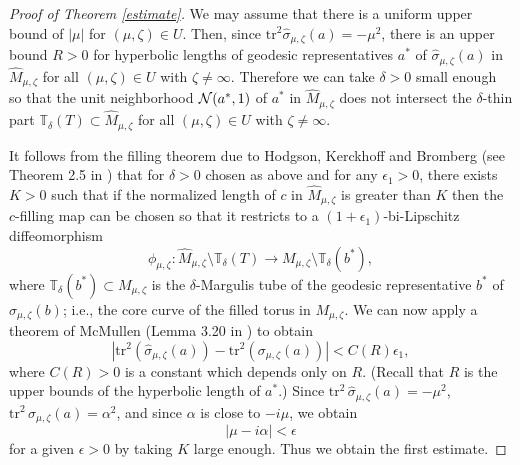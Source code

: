 \documentclass[12pt]{article}
\theoremstyle{plain}
\theoremstyle{definition}
\theoremstyle{remark}
\newcommand{\alp}{\alpha}
\newcommand{\fty}{\infty}
\newcommand{\ep}{\epsilon}
\newcommand{\sm}{\setminus}
\newcommand{\ze}{\zeta}
\newcommand{\tr}{{\mathrm{tr}}}
\begin{document}
\begin{proof} [Proof of Theorem \ref{estimate}]
We may assume that there is a uniform upper bound of $|\mu|$  for  $(\mu,\ze) \in U$. 
Then, since $\tr^2 \hat \sigma_{\mu,\ze}(a)=-\mu^2$, there is an upper bound 
$R>0$ for hyperbolic lengths of 
geodesic representatives $a^*$ of $\hat \sigma_{\mu,\ze}(a)$ in 
$\hat M_{\mu,\ze}$ for all $(\mu,\ze) \in U$ with $\ze \ne \fty$. 
Therefore we can take $\delta>0$ small enough 
so that  the unit neighborhood ${\cal N}(a^*,1)$ of 
$a^*$ in $\hat M_{\mu,\ze}$ does not intersect the 
$\delta$-thin part $\mathbb{T}_\delta(T) \subset \hat M_{\mu,\ze}$ 
for all $(\mu,\ze) \in U$ with $\ze \ne \fty$. 

It follows from the filling theorem due to Hodgson, Kerckhoff and Bromberg (see Theorem 2.5 in \cite{Br}) that 
for $\delta>0$ chosen as above and for any $\ep_1>0$, there exists $K>0$ such that 
if the normalized length  of $c$  in $\hat M_{\mu,\ze}$ is greater than $K$ 
then the $c$-filling map can be chosen  
so that it restricts to a $(1+\ep_1)$-bi-Lipschitz diffeomorphism 
$$
\phi_{\mu,\ze}: \hat M_{\mu,\ze} \sm \mathbb{T}_\delta(T) 
\to M_{\mu,\ze} \sm \mathbb{T}_\delta(b^*),  
$$
where $\mathbb{T}_\delta(b^*) \subset M_{\mu,\ze}$ is the $\delta$-Margulis tube 
of the geodesic representative $b^*$ of $\sigma_{\mu,\ze}(b)$; i.e., 
the core curve of the filled torus in $M_{\mu,\ze}$. 
We can now apply a theorem of McMullen (Lemma 3.20 in \cite{Mc1}) to obtain 
$$
|\tr^2 (\hat \sigma_{\mu,\ze}(a))-\tr^2 ( \sigma_{\mu,\ze}(a))|<C(R)\ep_1, 
$$
where $C(R)>0$ is a constant which depends only on $R$. 
(Recall that $R$ is the upper bounds of the hyperbolic length of $a^*$.)   
Since $\tr^2\, \hat \sigma_{\mu,\ze}(a)=-\mu^2$, $\tr^2\, \sigma_{\mu,\ze}(a)=\alpha^2$,  
and since $\alp$ is close to $-i\mu$,   
we obtain 
$$
|\mu-i\alp|<\ep
$$
for a  given $\ep>0$ by taking  $K$ large enough. 
Thus we obtain the first estimate. 


\end{proof}
\end{document}
